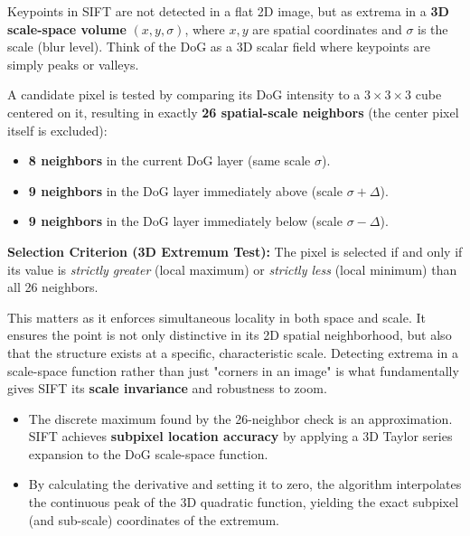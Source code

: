 {
Keypoints in SIFT are not detected in a flat 2D image, but as extrema in a \textbf{3D scale-space volume} $(x, y, \sigma)$, where $x,y$ are spatial coordinates and $\sigma$ is the scale (blur level). Think of the DoG as a 3D scalar field where keypoints are simply peaks or valleys.

A candidate pixel is tested by comparing its DoG intensity to a $3 \times 3 \times 3$ cube centered on it, resulting in exactly \textbf{26 spatial-scale neighbors} (the center pixel itself is excluded):
\begin{itemize}
    \item \textbf{8 neighbors} in the current DoG layer (same scale $\sigma$).
    \item \textbf{9 neighbors} in the DoG layer immediately above (scale $\sigma + \Delta$).
    \item \textbf{9 neighbors} in the DoG layer immediately below (scale $\sigma - \Delta$).
\end{itemize}

\textbf{Selection Criterion (3D Extremum Test):}
The pixel is selected if and only if its value is \textit{strictly greater} (local maximum) or \textit{strictly less} (local minimum) than all 26 neighbors. 

This matters as it enforces simultaneous locality in both space and scale. It ensures the point is not only distinctive in its 2D spatial neighborhood, but also that the structure exists at a specific, characteristic scale. Detecting extrema in a scale-space function rather than just "corners in an image" is what fundamentally gives SIFT its \textbf{scale invariance} and robustness to zoom.
}

{
\begin{itemize}
    \item The discrete maximum found by the 26-neighbor check is an approximation. SIFT achieves \textbf{subpixel location accuracy} by applying a 3D Taylor series expansion to the DoG scale-space function. 
    \item By calculating the derivative and setting it to zero, the algorithm interpolates the continuous peak of the 3D quadratic function, yielding the exact subpixel (and sub-scale) coordinates of the extremum.
\end{itemize}
}

